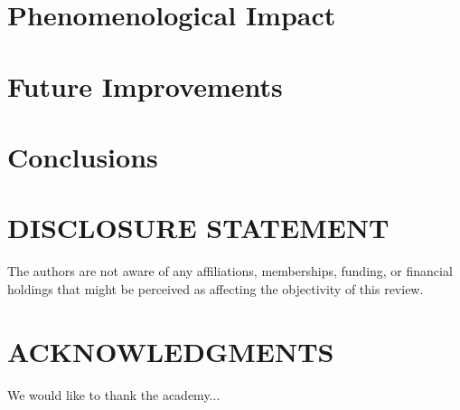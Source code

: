 \documentclass{ar-1col}
\begin{document}
\section{Phenomenological Impact\label{sec:impact}}



\section{Future Improvements\label{sec:future}}



\section{Conclusions\label{sec:conclusions}}



\section*{DISCLOSURE STATEMENT}
The authors are not aware of any affiliations, memberships, funding, or financial holdings that might be perceived as affecting the objectivity of this review.

\section*{ACKNOWLEDGMENTS} %
We would like to thank the academy...




\end{document}
